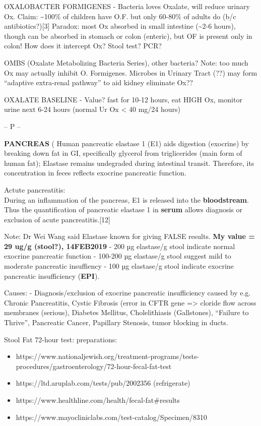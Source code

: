 OXALOBACTER FORMIGENES - Bacteria loves Oxalate, will reduce urinary Ox.
Claim: \textasciitilde100\% of children have O.F. but only 60-80\% of
adults do (b/c antibiotics?){[}3{]} Paradox: most Ox absorbed in small
intestine (\textasciitilde2-6 hours), though can be absorbed in stomach
or colon (enteric), but OF is present only in colon! How does it
intercept Ox? Stool test? PCR?

OMBS (Oxalate Metabolizing Bacteria Series), other bacteria? Note: too
much Ox may actually inhibit O. Formigenes. Microbes in Urinary Tract
(??) may form ``adaptive extra-renal pathway'' to aid kidney eliminate
Ox??

OXALATE BASELINE - Value? fast for 10-12 hours, eat HIGH Ox, monitor
urine next 6-24 hours (normal Ur Ox \textless{} 40 mg/24 hours)

-- P --

\textbf{PANCREAS} ( Human pancreatic elastase 1 (E1) aids digestion
(exocrine) by breaking down fat in GI, specifically glycerol from
triglicerides (main form of human fat); Elastase remains undegraded
during intestinal transit. Therefore, its concentration in feces
reflects exocrine pancreatic function.

Actute pancreatitis:\\
During an inflammation of the pancreas, E1 is released into the
\textbf{bloodstream}. Thus the quantification of pancreatic elastase 1
in \textbf{serum} allows diagnosis or exclusion of acute
pancreatitis.{[}12{]}

Note: Dr Wei Wang said Elastase known for giving FALSE results.
\textbf{My value = 29 ug/g (stool?), 14FEB2019} - 200 µg elastase/g
stool indicate normal exocrine pancreatic function - 100-200 µg
elastase/g stool suggest mild to moderate pancreatic insuffiency - 100
µg elastase/g stool indicate exocrine pancreatic insufficiency
(\textbf{EPI}).

Causes: - Diagnosis/exclusion of exocrine pancreatic insufficiency
caused by e.g. Chronic Pancreatitis, Cystic Fibrosis (error in CFTR gene
=\textgreater{} cloride flow across membranes (serious), Diabetes
Mellitus, Cholelithiasis (Gallstones), ``Failure to Thrive'', Pancreatic
Cancer, Papillary Stenosis, tumor blocking in ducts.

Stool Fat 72-hour test: preparations:

\begin{itemize}
\tightlist
\item
  https://www.nationaljewish.org/treatment-programs/tests-procedures/gastroenterology/72-hour-fecal-fat-test
\item
  https://ltd.aruplab.com/tests/pub/2002356 (refrigerate)
\item
  https://www.healthline.com/health/fecal-fat\#results
\item
  https://www.mayocliniclabs.com/test-catalog/Specimen/8310
\end{itemize}

